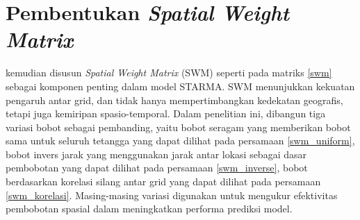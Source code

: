 \section{Pembentukan \textit{Spatial Weight Matrix}}
kemudian disusun \textit{Spatial Weight Matrix} (SWM) seperti pada matriks \ref{swm}  sebagai komponen penting dalam model STARMA. SWM menunjukkan kekuatan pengaruh antar grid, dan tidak hanya mempertimbangkan kedekatan geografis, tetapi juga kemiripan spasio-temporal. Dalam penelitian ini, dibangun tiga variasi bobot sebagai pembanding, yaitu bobot seragam yang memberikan bobot sama untuk seluruh tetangga yang dapat dilihat pada persamaan \ref{swm_uniform}, bobot invers jarak yang menggunakan jarak antar lokasi sebagai dasar pembobotan yang dapat dilihat pada persamaan \ref{swm_inverse}, bobot berdasarkan korelasi silang antar grid yang dapat dilihat pada persamaan \ref{swm_korelasi}. Masing-masing variasi digunakan untuk mengukur efektivitas pembobotan spasial dalam meningkatkan performa prediksi model.